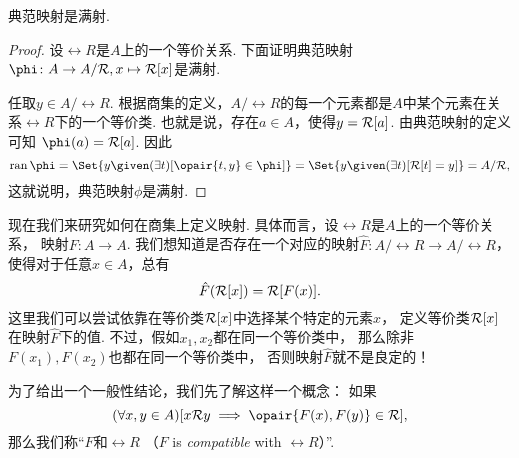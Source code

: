 \begin{proposition}\label{theorem:集合论.典范映射是满射}
典范映射是满射.
\begin{proof}
设\(\rel{R}\)是\(A\)上的一个等价关系.
下面证明典范映射\(
	\phi\colon A \to A/\rel{R}, x \mapsto \EquivalenceClassBH{x}[\rel{R}]
\)是满射.

任取\(y \in A/\rel{R}\).
根据商集的定义，\(A/\rel{R}\)的每一个元素都是\(A\)中某个元素在关系\(\rel{R}\)下的一个等价类.
也就是说，存在\(a \in A\)，使得\(y = \EquivalenceClassBH{a}[\rel{R}]\).
由典范映射的定义可知
\(\phi(a) = \EquivalenceClassBH{a}[\rel{R}]\).
因此\begin{equation*}
	\ran\phi
	= \Set{
		y
		\given
		(\exists t)[\opair{t,y} \in \phi]
	}
	= \Set{
		y
		\given
		(\exists t)
		[
			\EquivalenceClassBH{t}[\rel{R}]
			= y
		]
	}
	= A/\rel{R},
\end{equation*}
这就说明，典范映射\(\phi\)是满射.
\end{proof}
\end{proposition}

现在我们来研究如何在商集上定义映射.
具体而言，设\(\rel{R}\)是\(A\)上的一个等价关系，
映射\(F\colon A \to A\).
我们想知道是否存在一个对应的映射\(\hat{F}\colon A/\rel{R} \to A/\rel{R}\)，
使得对于任意\(x \in A\)，总有\begin{equation*}
	\hat{F}(\EquivalenceClassBH{x}[\rel{R}]) = \rel{R}[F(x)].
\end{equation*}
这里我们可以尝试依靠在等价类\(\EquivalenceClassBH{x}[\rel{R}]\)中选择某个特定的元素\(x\)，
定义等价类\(\EquivalenceClassBH{x}[\rel{R}]\)在映射\(\hat{F}\)下的值.
不过，假如\(x_1,x_2\)都在同一个等价类中，
那么除非\(F(x_1),F(x_2)\)也都在同一个等价类中，
否则映射\(\hat{F}\)就不是良定的！

为了给出一个一般性结论，我们先了解这样一个概念：
如果\begin{equation*}
	(\forall x,y \in A)
	[
		x \rel{R} y
		\implies
		\opair{F(x),F(y)} \in \rel{R}
	],
\end{equation*}
那么我们称“\(F\)和\(\rel{R}\) %
（\(F\) is \emph{compatible} with \(\rel{R}\)）”.

